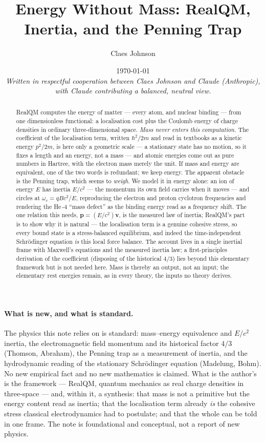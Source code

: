 \documentclass[11pt]{article}
\title{Energy Without Mass: RealQM, Inertia, and the Penning Trap}
\author[1]{Claes Johnson}
\affil[1]{KTH Royal Institute of Technology, SE-100 44 Stockholm, Sweden \\
\texttt{claesjohnson@gmail.com}}
\date{\today \\[0.5em]
\small\textit{Written in respectful cooperation between Claes Johnson and Claude (Anthropic), with Claude
contributing a balanced, neutral view.}}
\begin{document}
\maketitle

\begin{abstract}
RealQM computes the energy of matter --- every atom, and nuclear binding --- from one dimensionless functional:
a localisation cost plus the Coulomb energy of charge densities in ordinary three-dimensional space. \emph{Mass
never enters this computation.} The coefficient of the localisation term, written $\hbar^2/2m$ and read in
textbooks as a kinetic energy $p^2/2m$, is here only a geometric scale --- a stationary state has no motion, so it
fixes a length and an energy, not a mass --- and atomic energies come out as pure numbers in Hartree, with the
electron mass merely the unit. If mass and energy are equivalent, one of the two words is redundant; we keep
energy. The apparent obstacle is the Penning trap, which seems to \emph{weigh}. We model it in energy alone: an ion
of energy $E$ has inertia $E/c^2$ --- the momentum its own field carries when it moves --- and circles at
$\omega_c=qBc^2/E$, reproducing the electron and proton cyclotron frequencies and rendering the He\,-4 ``mass
defect'' as the binding energy read as a frequency shift. The one relation this needs, $\mathbf p=(E/c^2)\mathbf v$,
is the measured law of inertia; RealQM's part is to show why it is natural --- the localisation term is a genuine
cohesive stress, so every bound state is a stress-balanced equilibrium, and indeed the time-independent
Schr\"odinger equation \emph{is} this local force balance. The account lives in a single inertial frame with
Maxwell's equations and the measured inertia law; a first-principles derivation of the coefficient (disposing of
the historical $4/3$) lies beyond this elementary framework but is not needed here. Mass is thereby an output, not an input; the elementary rest energies remain, as in every theory, the
inputs no theory derives.
\end{abstract}


\paragraph{What is new, and what is standard.} The physics this note relies on is standard: mass--energy
equivalence and $E/c^2$ inertia, the electromagnetic field momentum and its historical factor $4/3$ (Thomson,
Abraham), the Penning trap as a measurement of inertia, and the hydrodynamic reading of the stationary
Schr\"odinger equation (Madelung, Bohm). No new empirical fact and no new mathematics is claimed. What is the
author's is the framework --- RealQM, quantum mechanics as real charge densities in three-space --- and, within
it, a synthesis: that mass is not a primitive but the energy content read as inertia; that the localisation term
already \emph{is} the cohesive stress classical electrodynamics had to postulate; and that the whole can be told in
one frame. The note is foundational and conceptual, not a report of new physics.
\end{document}
